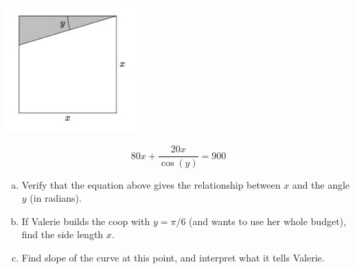 \documentclass[11pt]{exam}
\begin{document}
\begin{questions}
\includegraphics[width=2in]{Figures/coop.jpg}

\vspace*{-2cm}

$$80x + \frac{20x}{\cos(y)}=900$$
\begin{enumerate}[(a)]

\item Verify that the equation above gives the relationship between $x$ and the angle $y$ (in radians).

\vfill


\item If Valerie builds the coop with $y=\pi/6$ (and wants to use her whole budget), find the side length $x$.

\vfill

\item Find slope of the curve at this point, and interpret what it tells Valerie.

\vfill


\end{enumerate}
\end{questions}
\end{document}

